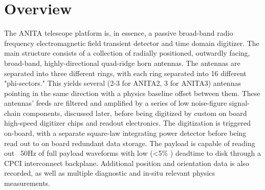 \section{Overview}
	The ANITA telescope platform is, in essence, a passive broad-band radio frequency electromagnetic field transient detector and time domain digitizer.  The main structure consists of a collection of radially positioned, outwardly facing, broad-band, highly-directional quad-ridge horn antennas.  The antennas are separated into three different rings, with each ring separated into 16 different "phi-sectors."  This yields several (2-3 for ANITA2, 3 for ANITA3) antennas pointing in the same direction with a physics baseline offset between them. These antennas' feeds are filtered and amplified by a series of low noise-figure signal-chain components, discussed later, before being digitized by custom on board high-speed digitizer chips and readout electronics.  The digitization is triggered on-board, with a separate square-law integrating power detector before being read out to on board redundant data storage.  The payload is capable of reading out ~50Hz of full payload waveforms with low (\textless 5\% ) deadtime to disk through a CPCI interconnect backplane.  Additional position and orientation data is also recorded, as well as multiple diagnostic and in-situ relevant physics measurements.
	
